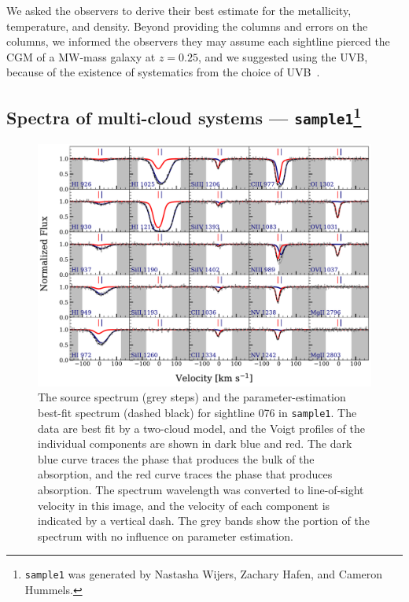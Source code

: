 \documentclass[fleqn,usenatbib]{mnras}
\begin{document}
We asked the observers to derive their best estimate for the metallicity, temperature, and density.
Beyond providing the columns and errors on the columns, we informed the observers they may assume each sightline pierced the CGM of a MW-mass galaxy at $z=0.25$, and we suggested using the \cite{haardt2012RADIATIVE} UVB, because of the existence of systematics from the choice of UVB~\citep{Wotta2016, Wotta2019, acharya2021How,Gibson2022}.

\subsection[Spectra of multi-cloud systems --- \texttt{sample1}]{Spectra of multi-cloud systems --- \texttt{sample1}\footnote{
\texttt{sample1} was generated by Nastasha Wijers, Zachary Hafen, and Cameron Hummels.
}}
\label{s: data generation -- sample1}

\begin{figure}
    \centering
    \includegraphics[width=\textwidth]{figures/sample1/Models_076.pdf}
    \caption{
    The source spectrum (grey steps) and the parameter-estimation best-fit spectrum (dashed black) for sightline 076 in \texttt{sample1}.
    The data are best fit by a two-cloud model, and the Voigt profiles of the individual components are shown in dark blue and red. 
    The dark blue curve traces the phase that produces the bulk of the  absorption, and the red curve traces the phase that produces  absorption.
    The spectrum wavelength was converted to line-of-sight velocity in this image,
    and the velocity of each component is indicated by a vertical dash.
    The grey bands show the portion of the spectrum with no influence on parameter estimation.
    }
    \label{f: sample1 spectrum}
\end{figure}
\end{document}
